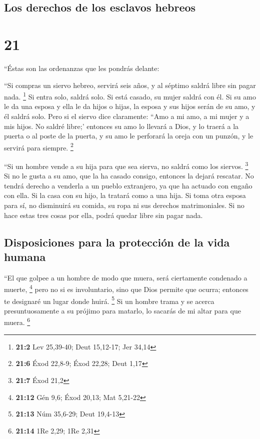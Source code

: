 \hypertarget{los-derechos-de-los-esclavos-hebreos}{%
\subsection{Los derechos de los esclavos
hebreos}\label{los-derechos-de-los-esclavos-hebreos}}

\hypertarget{section-20}{%
\section{21}\label{section-20}}

 ``Éstas son las ordenanzas que les pondrás delante:

 ``Si compras un siervo hebreo, servirá seis años, y al
séptimo saldrá libre sin pagar nada. \footnote{\textbf{21:2} Lev
  25,39-40; Deut 15,12-17; Jer 34,14}  Si entra solo,
saldrá solo. Si está casado, su mujer saldrá con él.  Si
su amo le da una esposa y ella le da hijos o hijas, la esposa y sus
hijos serán de su amo, y él saldrá solo.  Pero si el
siervo dice claramente: ``Amo a mi amo, a mi mujer y a mis hijos. No
saldré libre;'  entonces su amo lo llevará a Dios, y lo
traerá a la puerta o al poste de la puerta, y su amo le perforará la
oreja con un punzón, y le servirá para siempre. \footnote{\textbf{21:6}
  Éxod 22,8-9; Éxod 22,28; Deut 1,17}

 ``Si un hombre vende a su hija para que sea sierva, no
saldrá como los siervos. \footnote{\textbf{21:7} Éxod 21,2}
 Si no le gusta a su amo, que la ha casado consigo,
entonces la dejará rescatar. No tendrá derecho a venderla a un pueblo
extranjero, ya que ha actuado con engaño con ella.  Si la
casa con su hijo, la tratará como a una hija.  Si toma
otra esposa para sí, no disminuirá su comida, su ropa ni sus derechos
matrimoniales.  Si no hace estas tres cosas por ella,
podrá quedar libre sin pagar nada.

\hypertarget{disposiciones-para-la-protecciuxf3n-de-la-vida-humana}{%
\subsection{Disposiciones para la protección de la vida
humana}\label{disposiciones-para-la-protecciuxf3n-de-la-vida-humana}}

 ``El que golpee a un hombre de modo que muera, será
ciertamente condenado a muerte, \footnote{\textbf{21:12} Gén 9,6; Éxod
  20,13; Mat 5,21-22}  pero no si es involuntario, sino
que Dios permite que ocurra; entonces te designaré un lugar donde huirá.
\footnote{\textbf{21:13} Núm 35,6-29; Deut 19,4-13}  Si
un hombre trama y se acerca presuntuosamente a su prójimo para matarlo,
lo sacarás de mi altar para que muera. \footnote{\textbf{21:14} 1Re
  2,29; 1Re 2,31}

